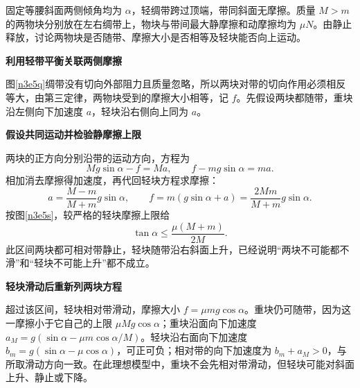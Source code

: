 \begin{question}\begin{example}[光滑双斜面上的轻绸带]\label{n3e5}
固定等腰斜面两侧倾角均为 $\alpha$，轻绸带跨过顶端，带同斜面无摩擦。质量 $M>m$ 的两物块分别放在左右绸带上，物块与带间最大静摩擦和动摩擦均为 $\mu N$。由静止释放，讨论两物块是否随带、摩擦大小是否相等及轻块能否向上运动。
\end{example}\end{question}
\begin{solution}\textbf{利用轻带平衡关联两侧摩擦}\par\nobreak
图\ref{n3e5q}绸带没有切向外部阻力且质量忽略，所以两块对带的切向作用必须相反等大，由第三定律，两物块受到的摩擦大小相等，记 $f$。先假设两块都随带，重块沿左侧向下加速度 $a$，轻块沿右侧向上同为 $a$。



\par\medskip{}\noindent\textbf{假设共同运动并检验静摩擦上限}\par\nobreak
两块的正方向分别沿带的运动方向，方程为
\[
Mg\sin\alpha-f=Ma,\qquad f-mg\sin\alpha=ma.
\]
相加消去摩擦得加速度，再代回轻块方程求摩擦：
\[
a=\frac{M-m}{M+m}g\sin\alpha,\qquad
f=m(g\sin\alpha+a)=\frac{2Mm}{M+m}g\sin\alpha.
\]按图\ref{n3e5s}，较严格的轻块摩擦上限给
\[\tan\alpha\le\frac{\mu(M+m)}{2M}.\]
此区间两块都可相对带静止，轻块随带沿右斜面上升，已经说明“两块不可能都不滑”和“轻块不可能上升”都不成立。



\par\medskip{}\noindent\textbf{轻块滑动后重新列两块方程}\par\nobreak
超过该区间，轻块相对带滑动，摩擦大小 $f=\mu mg\cos\alpha$。重块仍可随带，因为这一摩擦小于它自己的上限 $\mu Mg\cos\alpha$；重块沿面向下加速度 $a_M=g(\sin\alpha-\mu m\cos\alpha/M)$。轻块沿右面向下加速度 $b_m=g(\sin\alpha-\mu\cos\alpha)$，可正可负；相对带的向下加速度为 $b_m+a_M>0$，与所取滑动方向一致。在此理想模型中，重块不会先相对带滑动，但轻块可能对斜面上升、静止或下降。
\end{solution}

